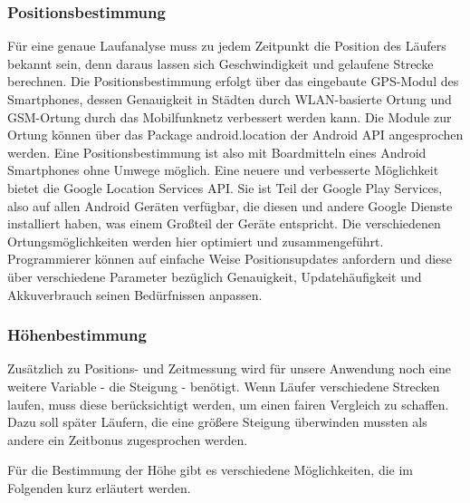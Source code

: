 \subsubsection{Positionsbestimmung}
Für eine genaue Laufanalyse muss zu jedem Zeitpunkt die Position des Läufers bekannt sein, denn daraus lassen sich Geschwindigkeit und gelaufene Strecke berechnen. Die Positionsbestimmung erfolgt über das eingebaute GPS-Modul des Smartphones, dessen Genauigkeit in Städten durch WLAN-basierte Ortung und GSM-Ortung durch das Mobilfunknetz verbessert werden kann. Die Module zur Ortung können über das Package android.location der Android API angesprochen werden. Eine Positionsbestimmung ist also mit Boardmitteln eines Android Smartphones ohne Umwege möglich. Eine neuere und verbesserte Möglichkeit bietet die Google Location Services API. Sie ist Teil der Google Play Services, also auf allen Android Geräten verfügbar, die diesen und andere Google Dienste installiert haben, was einem Großteil der Geräte entspricht. Die verschiedenen Ortungsmöglichkeiten werden hier optimiert und zusammengeführt. Programmierer können auf einfache Weise Positionsupdates anfordern und diese über verschiedene Parameter bezüglich Genauigkeit, Updatehäufigkeit und Akkuverbrauch seinen Bedürfnissen anpassen. \cite{androidlocation}
\subsubsection{Höhenbestimmung}
Zusätzlich zu Positions- und Zeitmessung wird für unsere Anwendung noch eine weitere Variable - die Steigung - benötigt. Wenn Läufer verschiedene Strecken laufen, muss diese berücksichtigt werden, um einen fairen Vergleich zu schaffen. Dazu soll später Läufern, die eine größere Steigung überwinden mussten als andere ein Zeitbonus zugesprochen werden.

Für die Bestimmung der Höhe gibt es verschiedene Möglichkeiten, die im Folgenden kurz erläutert werden.
